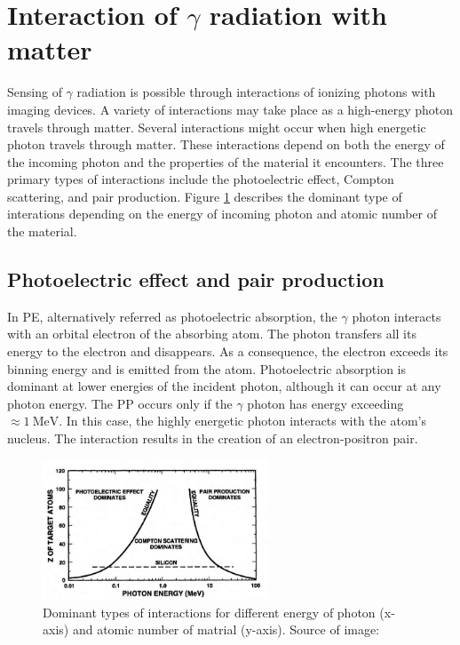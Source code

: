 \section{Interaction of $\gamma$ radiation with matter}
Sensing of $\gamma$ radiation is possible through interactions of ionizing photons with imaging devices.
A variety of interactions may take place as a high-energy photon travels through matter.
Several interactions might occur when high energetic photon travels through matter.
These interactions depend on both the energy of the incoming photon and the properties of the material it encounters. 
The three primary types of interactions include the photoelectric effect, Compton scattering, and pair production.
Figure \ref{fig:dominant} describes the dominant type of interations depending on the energy of incoming photon and atomic number of the material.


\subsection{Photoelectric effect and pair production}
In \ac{PE}, alternatively referred as photoelectric absorption, the $\gamma$ photon interacts with an orbital electron of the absorbing atom.
The photon transfers all its energy to the electron and disappears.
As a consequence, the electron exceeds its binning energy and is emitted from the atom.
Photoelectric absorption is dominant at lower energies of the incident photon, although it can occur at any photon energy.
The \ac{PP} occurs only if the $\gamma$ photon has energy exceeding $\approx \SI{1}{\mega\electronvolt}$.
In this case, the highly energetic photon interacts with the atom's nucleus. 
The interaction results in the creation of an electron-positron pair.

\begin{figure}[!h]
  \centering 

    \includegraphics[width=0.6\textwidth]{./fig/photos/dominant.png}
  \caption{Dominant types of interactions for different energy of photon (x-axis) and atomic number of matrial (y-axis). Source of image: \cite{schwank}}
    \label{fig:dominant}
  
\end{figure}

